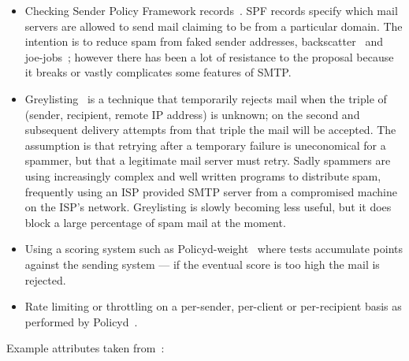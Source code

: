 \documentclass[a4paper,12pt,draft]{article}
\begin{document}
\begin{itemize}

    \item Checking Sender Policy Framework records~\cite{openspf,
        wikipedia-spf}.  SPF records specify which mail servers are allowed
        to send mail claiming to be from a particular domain.  The
        intention is to reduce spam from faked sender addresses,
        backscatter~\cite{postfix-backscatter} and
        joe-jobs~\cite{wikipedia-joe-job}; however there has been a lot of
        resistance to the proposal because it breaks or vastly complicates
        some features of SMTP\@.

    \item Greylisting~\cite{greylisting} is a technique that temporarily
        rejects mail when the triple of (sender, recipient, remote IP
        address) is unknown; on the second and subsequent delivery attempts
        from that triple the mail will be accepted.  The assumption is that
        retrying after a temporary failure is uneconomical for a spammer,
        but that a legitimate mail server must retry.  Sadly spammers are
        using increasingly complex and well written programs to distribute
        spam, frequently using an ISP provided SMTP server from a
        compromised machine on the ISP's network.  Greylisting is slowly
        becoming less useful, but it does block a large percentage of spam
        mail at the moment.

    \item Using a scoring system such as
        Policyd-weight~\cite{policyd-weight} where tests accumulate points
        against the sending system --- if the eventual score is too high
        the mail is rejected.
        
    \item Rate limiting or throttling on a per-sender, per-client or
        per-recipient basis as performed by Policyd~\cite{policyd}.

\end{itemize}

Example attributes taken from~\cite{policy-servers}:
\end{document}
